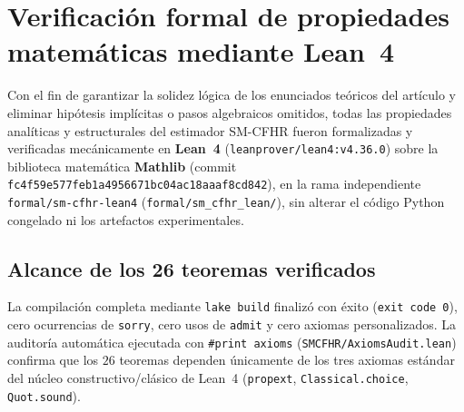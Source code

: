 \section{Verificación formal de propiedades matemáticas mediante Lean~4}\label{app:lean4}

Con el fin de garantizar la solidez lógica de los enunciados teóricos del artículo y eliminar hipótesis implícitas o pasos algebraicos omitidos, todas las propiedades analíticas y estructurales del estimador SM-CFHR fueron formalizadas y verificadas mecánicamente en \textbf{Lean~4} (\texttt{leanprover/lean4:v4.36.0}) sobre la biblioteca matemática \textbf{Mathlib} (commit \texttt{fc4f59e577feb1a4956671bc04ac18aaaf8cd842}), en la rama independiente \texttt{formal/sm-cfhr-lean4} (\texttt{formal/sm\_cfhr\_lean/}), sin alterar el código Python congelado ni los artefactos experimentales.

\subsection{Alcance de los 26 teoremas verificados}

La compilación completa mediante \texttt{lake build} finalizó con éxito (\texttt{exit code 0}), cero ocurrencias de \texttt{sorry}, cero usos de \texttt{admit} y cero axiomas personalizados. La auditoría automática ejecutada con \texttt{\#print axioms} (\texttt{SMCFHR/AxiomsAudit.lean}) confirma que los $26$ teoremas dependen únicamente de los tres axiomas estándar del núcleo constructivo/clásico de Lean~4 (\texttt{propext}, \texttt{Classical.choice}, \texttt{Quot.sound}).

